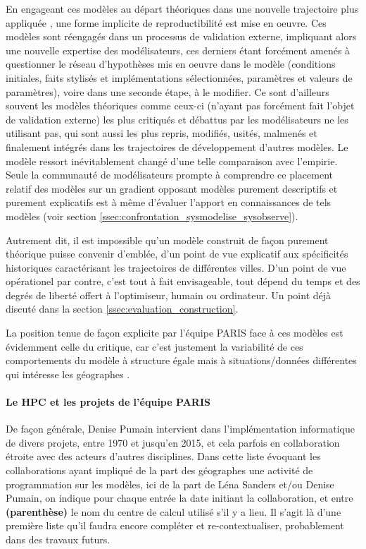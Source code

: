En engageant ces modèles au départ théoriques dans une nouvelle trajectoire plus appliquée \autocite{Banos2013a}, une forme implicite de reproductibilité est mise en oeuvre. Ces modèles sont réengagés dans un processus de validation externe, impliquant alors une nouvelle expertise des modélisateurs, ces derniers étant forcément amenés à questionner le réseau d'hypothèses mis en oeuvre dans le modèle (conditions initiales, faits stylisés et implémentations sélectionnées, paramètres et valeurs de paramètres), voire dans une seconde étape, à le modifier. Ce sont d'ailleurs souvent les modèles théoriques comme ceux-ci (n'ayant pas forcément fait l'objet de validation externe) les plus critiqués et débattus par les modélisateurs ne les utilisant pas, qui sont aussi les plus repris, modifiés, usités, malmenés et finalement intégrés dans les trajectoires de développement d'autres modèles. Le modèle ressort inévitablement changé d'une telle comparaison avec l'empirie. Seule la communauté de modélisateurs prompte à comprendre ce placement relatif des modèles sur un gradient opposant modèles purement descriptifs et purement explicatifs est à même d'évaluer l'apport en connaissances de tels modèles \autocites{Bulle2005, Rouchier2013} (voir section \ref{ssec:confrontation_sysmodelise_sysobserve}).  %

Autrement dit, il est impossible qu'un modèle construit de façon purement théorique puisse convenir d'emblée, d'un point de vue explicatif aux spécificités historiques caractérisant les trajectoires de différentes villes. D'un point de vue opérationel par contre, c'est tout à fait envisageable, tout dépend du temps et des degrés de liberté offert à l'optimiseur, humain ou ordinateur. Un point déjà discuté dans la section \ref{ssec:evaluation_construction}.

La position tenue de façon explicite par l'équipe PARIS face à ces modèles est évidemment celle du critique, car c'est justement la variabilité de ces comportements du modèle à structure égale mais à situations/données différentes qui intéresse les géographes \autocite[99-103]{Pumain1989}.

\paragraph{Le HPC et les projets de l'équipe PARIS}

De façon générale, Denise Pumain intervient dans l’implémentation informatique de divers projets, entre 1970 et jusqu’en 2015, et cela parfois en collaboration étroite avec des acteurs d’autres disciplines. Dans cette liste évoquant les collaborations ayant impliqué de la part des géographes une activité de programmation sur les modèles, ici de la part de Léna Sanders et/ou Denise Pumain, on indique pour chaque entrée la date initiant la collaboration, et entre \textbf{(parenthèse)} le nom du centre de calcul utilisé s'il y a lieu. Il s'agit là d'une première liste qu'il faudra encore compléter et re-contextualiser, probablement dans des travaux futurs.

